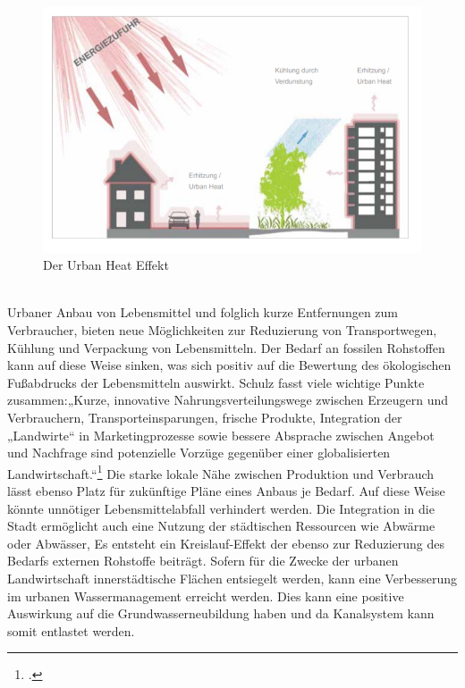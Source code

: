\documentclass{scrartcl}
\begin{document}
\begin{figure}[htbp]
\centering
\includegraphics[width=14cm]{image_folder/urbanheat.png}
\caption{Der Urban Heat Effekt}
\label{fig:urbanheateffekt}
\end{figure}
\\
Urbaner Anbau von Lebensmittel und folglich kurze Entfernungen zum Verbraucher, bieten neue Möglichkeiten zur Reduzierung von Transportwegen, Kühlung und Verpackung von Lebensmitteln. Der Bedarf an fossilen Rohstoffen kann auf diese Weise sinken, was sich positiv auf die Bewertung des ökologischen Fußabdrucks der Lebensmitteln auswirkt. Schulz fasst viele wichtige Punkte zusammen:„Kurze, innovative Nahrungsverteilungswege zwischen Erzeugern und Verbrauchern, Transporteinsparungen, frische Produkte, Integration der „Landwirte“ in Marketingprozesse sowie bessere Absprache zwischen Angebot und Nachfrage sind potenzielle Vorzüge gegenüber einer globalisierten Landwirtschaft.“\footcite[S.10]{Schulz2013UrbaneLandmanagements} Die starke lokale Nähe zwischen Produktion und Verbrauch lässt ebenso Platz für zukünftige Pläne eines Anbaus je Bedarf. Auf diese Weise könnte unnötiger Lebensmittelabfall verhindert werden. Die Integration in die Stadt ermöglicht auch eine Nutzung der städtischen Ressourcen wie Abwärme oder Abwässer, Es entsteht ein Kreislauf-Effekt der ebenso zur Reduzierung des Bedarfs externen Rohstoffe beiträgt.
Sofern für die Zwecke der urbanen Landwirtschaft innerstädtische Flächen entsiegelt werden, kann eine Verbesserung im urbanen Wassermanagement erreicht werden. Dies kann eine positive Auswirkung auf die Grundwasserneubildung haben und da Kanalsystem kann somit entlastet werden.  
  
\end{document}
